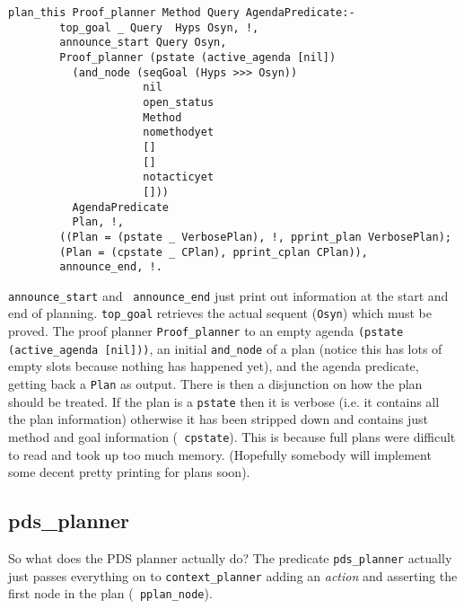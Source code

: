 \begin{verbatim}
plan_this Proof_planner Method Query AgendaPredicate:-
        top_goal _ Query  Hyps Osyn, !,
        announce_start Query Osyn,
        Proof_planner (pstate (active_agenda [nil]) 
          (and_node (seqGoal (Hyps >>> Osyn))
                     nil
                     open_status
                     Method
                     nomethodyet
                     []
                     []
                     notacticyet
                     []))
          AgendaPredicate
          Plan, !,
        ((Plan = (pstate _ VerbosePlan), !, pprint_plan VerbosePlan);
        (Plan = (cpstate _ CPlan), pprint_cplan CPlan)),
        announce_end, !.
\end{verbatim}
{\tt announce\_start} and {\tt
  announce\_end} just print out information at
the start and end of planning.  {\tt top\_goal}
retrieves the actual sequent ({\tt Osyn}) which must be proved.  The
proof planner {\tt Proof\_planner} to an empty agenda {\tt (pstate
  (active\_agenda [nil]))}, an
initial {\tt and\_node} of a plan (notice this has
lots of empty slots because nothing has happened yet), and the agenda
predicate, getting back a {\tt Plan} as
output.  There is then a disjunction on how the plan should be
treated.  If the plan is a {\tt pstate} then it is
verbose (i.e. it contains all the plan information) otherwise it has
been stripped down and contains just method and goal information ({\tt
  cpstate}).  This is because full plans were difficult
to read and took up too much memory.  (Hopefully somebody will
implement some decent pretty printing for plans soon).

\subsection{pds\_planner}
So what does the PDS planner actually do?  The
predicate {\tt pds\_planner} actually just passes everything on to
{\tt context\_planner} adding an {\em
  action} and asserting the first node in the plan ({\tt
  pplan\_node}).

